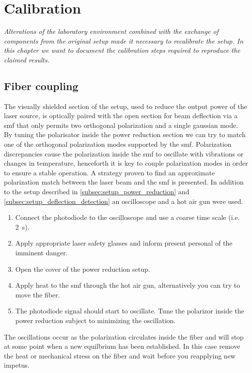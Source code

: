 \chapter{Calibration}

\textit{Alterations of the laboratory environment combined with the exchange
of components from the original setup made it necessary to recalibrate the
setup. In this chapter we want to document the calibration steps required to
reproduce the claimed results.}

\section{Fiber coupling}

The visually shielded section of the setup, used to reduce the output power
of the laser source, is optically paired with the open section for beam
deflection via a \gls{smf} that only permits two orthogonal polarization and
a single gaussian mode. By tuning the polarisator inside the power
reduction section we can try to match one of the orthogonal polarization
modes supported by the \gls{smf}. Polarization discrepancies cause the
polarization inside the \gls{smf} to oscillate with vibrations or changes in
temperature, henceforth it is key to couple polarization modes in order to
ensure a stable operation. A strategy proven to find an approximate
polarization match between the laser beam and the \gls{smf} is presented. In
addition to the setup described in \cref{subsec:setup_power_reduction} and
\cref{subsec:setup_deflection_detection} an oscilloscope and a hot air gun
were used.
\begin{enumerate}
  \item Connect the photodiode to the oscilloscope and use a coarse time
    scale (i.e. \SI{2}{\second}).
  \item Apply appropriate laser safety glasses and inform present personal
    of the imminent danger.
  \item Open the cover of the power reduction setup.
  \item Apply heat to the \gls{smf} through the hot air gun, alternatively
    you can try to move the fiber.
  \item The photodiode signal should start to oscillate. Tune the polarizor
    inside the power reduction subject to minimizing the oscillation.
\end{enumerate}
The oscillations occur as the polarization circulates inside the fiber and
will stop at some point when a new equilbrium has been established. In this
case remove the heat or mechanical stress on the fiber and wait before you
reapplying new impetus.

